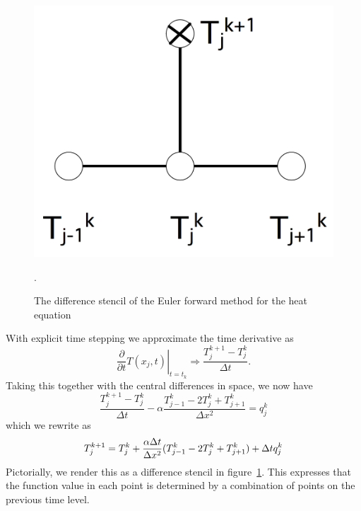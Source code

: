 \begin{figure}
  \leavevmode\kern\unitindent 
  \includegraphics[scale=.12]{graphics/euler-forward}
  \caption{The difference stencil of the Euler forward method for the
    heat equation}
  \label{fig:Euler-forward-stencil}.
\end{figure}
%
With explicit time stepping we approximate the time derivative as
\begin{equation}
  \left.\frac\partial{\partial t}T(x_j,t)\right|_{t=t_k}
  \Rightarrow
  \frac{T_j^{k+1}-T_j^k}{\Delta t}.
  \label{eq:disc-time-explicit}
\end{equation}
Taking this together with the central differences in space, we now have
\[
  \frac{T_j^{k+1}-T_j^k}{\Delta t}-\alpha
  \frac{T_{j-1}^k-2T_j^k+T_{j+1}^k}{\Delta x^2}=q_j^k 
\]
which we rewrite as
\begin{equation}
  \label{eq:bivp-explicit}
  T_j^{k+1}=T_j^k+\frac{\alpha\Delta t}{\Delta x^2}
  (T_{j-1}^k-2T_j^k+T_{j+1}^k)+\Delta t q_j^k 
\end{equation}
Pictorially, we render this as a difference stencil in
figure~\ref{fig:Euler-forward-stencil}.
This expresses that the function value in each point is determined by
a combination of points on the previous time level.

